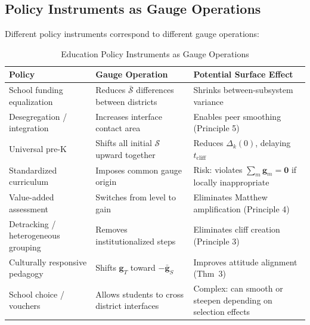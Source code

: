 \documentclass[11pt,a4paper]{article}
\newcommand{\cS}{\mathcal{S}}
\newcommand{\sumgd}{\sum_m \mathbf{g}_m = \mathbf{0}}
\begin{document}
\subsection{Policy Instruments as Gauge Operations}
Different policy instruments correspond to different gauge operations:
\begin{table}[h]
\centering
\caption{Education Policy Instruments as Gauge Operations}
\label{tab:policy_gauge}
\begin{tabular}{p{4cm} p{5.5cm} p{5.5cm}}
\toprule
\textbf{Policy} & \textbf{Gauge Operation} & \textbf{Potential Surface Effect} \\
\midrule
School funding equalization & Reduces $\bar{\cS}$ differences between districts & Shrinks between-subsystem variance \\
\addlinespace
Desegregation / integration & Increases interface contact area & Enables peer smoothing (Principle 5) \\
\addlinespace
Universal pre-K & Shifts all initial $\cS$ upward together & Reduces $\Delta_k(0)$, delaying $t_{\text{cliff}}$ \\
\addlinespace
Standardized curriculum & Imposes common gauge origin & Risk: violates $\sumgd$ if locally inappropriate \\
\addlinespace
Value-added assessment & Switches from level to gain & Eliminates Matthew amplification (Principle 4) \\
\addlinespace
Detracking / heterogeneous grouping & Removes institutionalized steps & Eliminates cliff creation (Principle 3) \\
\addlinespace
Culturally responsive pedagogy & Shifts $\mathbf{g}_T$ toward $-\bar{\mathbf{g}}_S$ & Improves attitude alignment (Thm~3) \\
\addlinespace
School choice / vouchers & Allows students to cross district interfaces & Complex: can smooth or steepen depending on selection effects \\
\bottomrule
\end{tabular}
\end{table}
\end{document}
